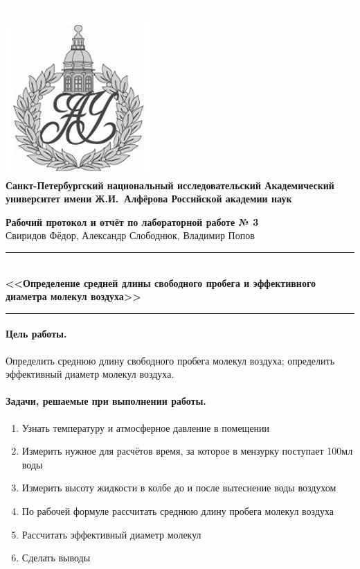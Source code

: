 \documentclass{article}
\begin{document}
	\begin{center}
		\includegraphics[scale=0.25]{AU}\\
		{\Large\bfseries Санкт-Петербургский национальный исследовательский Академический университет имени Ж.И.~Алфёрова Российской академии наук}
	\end{center}
	
	\begin{center}
		{\large\textbf{Рабочий протокол и отчёт по лабораторной работе № 3}}\\
		Свиридов Фёдор, Александр Слободнюк, Владимир Попов
	\end{center}
	
	\begin{center}
		\rule{12cm}{0.4mm}\\
		\large\bfseries{<<Определение  средней длины свободного пробега и эффективного диаметра молекул воздуха>>}\\
		\rule{12cm}{0.4mm}
	\end{center}
	
	\paragraph{Цель работы.}
	Определить среднюю длину свободного пробега молекул воздуха; определить эффективный диаметр молекул воздуха.
	
	\paragraph{Задачи, решаемые при выполнении работы.}
	\begin{enumerate}
		\item Узнать температуру и атмосферное давление в помещении 
		\item Измерить нужное для расчётов время, за которое в мензурку поступает 100мл воды
		\item Измерить высоту жидкости в колбе до и после вытеснение воды воздухом
		\item  По рабочей формуле рассчитать среднюю длину пробега молекул воздуха
		\item  Рассчитать эффективный диаметр молекул
		\item Сделать выводы
	\end{enumerate}
	
\end{document}
